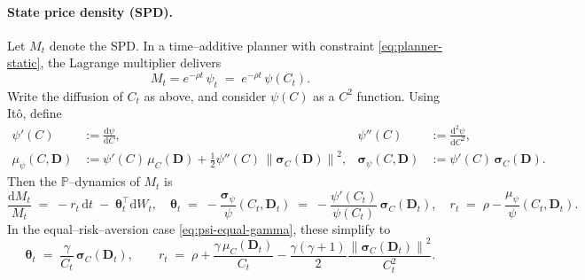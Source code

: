 \documentclass[11pt]{article}
\newcommand{\1}{\mathbbm{1}}
\newcommand{\norm}[1]{\left\lVert #1 \right\rVert}
\newcommand{\dd}{\mathrm{d}}
\newcommand{\bs}{\boldsymbol}
\begin{document}
\paragraph{State price density (SPD).}
Let \(M_t\) denote the SPD. In a time--additive planner with constraint \eqref{eq:planner-static}, the Lagrange multiplier delivers
\begin{equation}\label{eq:spd}
  M_t = e^{-\rho t}\,\psi_t \;=\; e^{-\rho t}\,\psi(C_t).
\end{equation}
Write the diffusion of \(C_t\) as above, and consider \(\psi(C)\) as a \(C^2\) function. Using Itô, define
\begin{align}
  \psi'(C) &:= \frac{\dd \psi}{\dd C}, 
  & \psi''(C) &:= \frac{\dd^2 \psi}{\dd C^2}, \\
  \mu_\psi(C,\bs D) &:= \psi'(C)\,\mu_C(\bs D) + \tfrac{1}{2}\psi''(C)\,\norm{\bs\sigma_C(\bs D)}^2, 
  & \bs\sigma_\psi(C,\bs D) &:= \psi'(C)\,\bs\sigma_C(\bs D).
\end{align}
Then the \(\mathbb{P}\)--dynamics of \(M_t\) is
\begin{equation}\label{eq:spd-dynamics}
  \frac{\dd M_t}{M_t} \;=\; -r_t\,\dd t \;-\; \bs\theta_t^\top \dd W_t,
  \quad 
  \bs\theta_t \;=\; -\frac{\bs\sigma_\psi}{\psi}(C_t,\bs D_t) 
  \;=\; -\frac{\psi'(C_t)}{\psi(C_t)}\,\bs\sigma_C(\bs D_t),
  \quad 
  r_t \;=\; \rho - \frac{\mu_\psi}{\psi}(C_t,\bs D_t).
\end{equation}
In the equal--risk--aversion case \eqref{eq:psi-equal-gamma}, these simplify to
\begin{equation}\label{eq:theta-r-equal-gamma}
  \bs\theta_t \;=\; \frac{\gamma}{C_t}\,\bs\sigma_C(\bs D_t),
  \qquad
  r_t \;=\; \rho + \frac{\gamma\,\mu_C(\bs D_t)}{C_t} - \frac{\gamma(\gamma+1)}{2}\frac{\norm{\bs\sigma_C(\bs D_t)}^2}{C_t^2}.
\end{equation}
\end{document}
